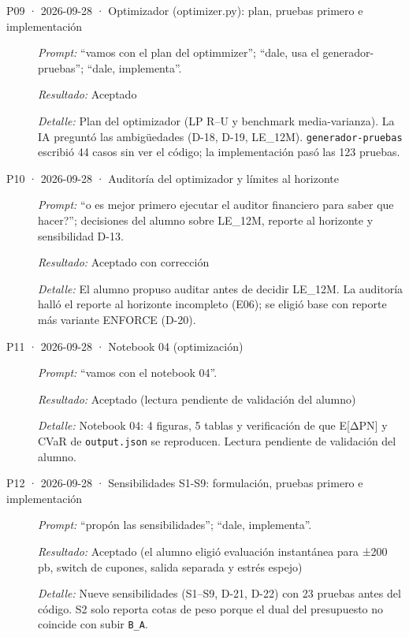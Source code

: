 \begin{description}
\item[P09 · 2026-09-28 · Optimizador (optimizer.py): plan, pruebas primero e implementación] \mbox{}\par
\textit{Prompt:} \enquote{vamos con el plan del optimmizer}; \enquote{dale, usa el generador-pruebas}; \enquote{dale, implementa}.\par
\textit{Resultado:} Aceptado\par
\textit{Detalle:} Plan del optimizador (LP R–U y benchmark media-varianza). La IA preguntó las ambigüedades (D-18, D-19, LE\_12M). \texttt{generador-pruebas} escribió 44 casos sin ver el código; la implementación pasó las 123 pruebas.\par
\item[P10 · 2026-09-28 · Auditoría del optimizador y límites al horizonte] \mbox{}\par
\textit{Prompt:} \enquote{o es mejor primero ejecutar el auditor financiero para saber que hacer?}; decisiones del alumno sobre LE\_12M, reporte al horizonte y sensibilidad D-13.\par
\textit{Resultado:} Aceptado con corrección\par
\textit{Detalle:} El alumno propuso auditar antes de decidir LE\_12M. La auditoría halló el reporte al horizonte incompleto (E06); se eligió base con reporte más variante ENFORCE (D-20).\par
\item[P11 · 2026-09-28 · Notebook 04 (optimización)] \mbox{}\par
\textit{Prompt:} \enquote{vamos con el notebook 04}.\par
\textit{Resultado:} Aceptado (lectura pendiente de validación del alumno)\par
\textit{Detalle:} Notebook 04: 4 figuras, 5 tablas y verificación de que E[ΔPN] y CVaR de \texttt{output.json} se reproducen. Lectura pendiente de validación del alumno.\par
\item[P12 · 2026-09-28 · Sensibilidades S1-S9: formulación, pruebas primero e implementación] \mbox{}\par
\textit{Prompt:} \enquote{propón las sensibilidades}; \enquote{dale, implementa}.\par
\textit{Resultado:} Aceptado (el alumno eligió evaluación instantánea para ±200 pb, switch de cupones, salida separada y estrés espejo)\par
\textit{Detalle:} Nueve sensibilidades (S1–S9, D-21, D-22) con 23 pruebas antes del código. S2 solo reporta cotas de peso porque el dual del presupuesto no coincide con subir \texttt{B\_A}.\par

\end{description}
